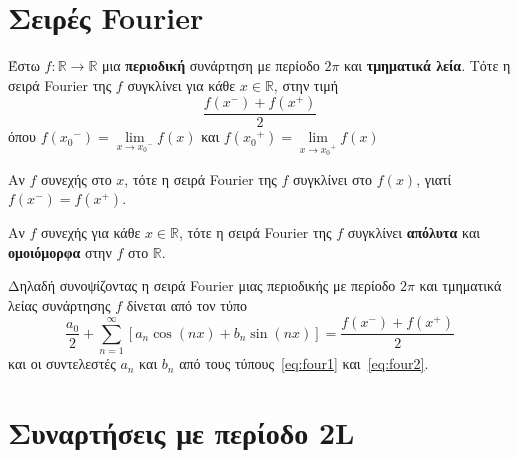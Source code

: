 \section{Σειρές Fourier}

\begin{thm}
  Έστω $ f \colon \mathbb{R} \to \mathbb{R} $ μια \textbf{περιοδική} συνάρτηση με 
  περίοδο $ 2 \pi $ και \textbf{τμηματικά λεία}. Τότε η σειρά Fourier της $f$ 
  συγκλίνει για κάθε $ x \in \mathbb{R} $, στην τιμή
  \[
    \frac{f(x^{-}) + f(x^{+})}{2} 
  \] 
  όπου $ f({x_{0}}^{-}) = \lim\limits_{x \to {x_{0}}^{-}} f(x) $ και 
  $ f({x_{0}}^{+}) = \lim\limits_{x \to {x_{0}}^{+}} f(x) $ 
\end{thm}

\begin{rem}
\item {}
  \begin{myitemize}
    \item Αν $f$ συνεχής στο $x$, τότε η σειρά Fourier της $f$ συγκλίνει στο $f(x)$, 
      γιατί $ f(x^{-}) = f(x^{+}) $.
    \item Αν $f$ συνεχής για κάθε $x \in \mathbb{R} $, τότε η σειρά Fourier της $f$ 
      συγκλίνει \textbf{απόλυτα} και \textbf{ομοιόμορφα} στην $f$ στο $ \mathbb{R} $.
  \end{myitemize}
\end{rem}

\begin{rem}
  Δηλαδή συνοψίζοντας η σειρά Fourier μιας περιοδικής με περίοδο $ 2 \pi $ και 
  τμηματικά λείας συνάρτησης $ f $ δίνεται από τον τύπο 
  \[
    \frac{a_{0}}{2} + \sum_{n=1}^{\infty} [a_{n} \cos{(nx)} + b_{n} \sin{(nx)}] =  
    \frac{f(x^{-}) + f(x^{+})}{2} 
  \] 
  και οι συντελεστές $ a_{n} $ και $ b_{n} $ από τους τύπους~\eqref{eq:four1}
  και~\eqref{eq:four2}.
\end{rem}

\section{Συναρτήσεις με περίοδο 2L}

